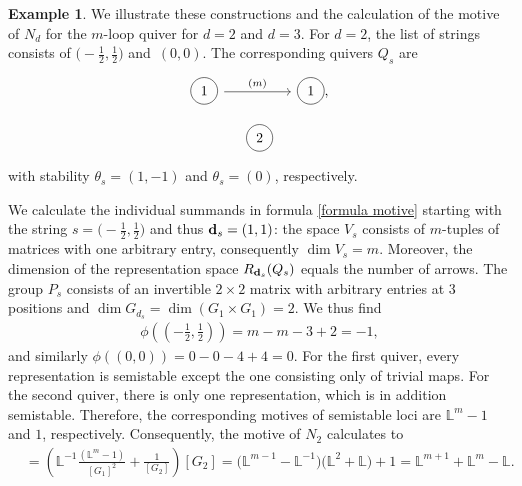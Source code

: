 \documentclass[pdftex]{sigma}
\newcommand\circlearound[1]{
 \tikz[baseline]\node[draw,shape=circle,anchor=base] {#1} ;}
\numberwithin{equation}{section}
\theoremstyle{definition}
\newtheorem{Example}[Theorem]{Example}
\begin{document}
\begin{Example}
We illustrate these constructions and the calculation of the motive of $N_{d}$ for the $m$-loop quiver for $d=2$ and $d=3$.
For $d=2$, the list of strings consists of
$\bigl(-\frac{1}{2}, \frac{1}{2}\bigr)$ and~$ (0,0)$. The corresponding quivers $Q_s$ are
\[\begin{tikzcd}
	\circlearound{1} && \circlearound{1}
	\arrow[from=1-1, to=1-3, "(m)"],
\end{tikzcd}\]
\[\begin{tikzcd}
	\circlearound{2}
\end{tikzcd}\]
with stability $\theta_s = (1,-1)$ and $\theta_s = (0)$, respectively.

We calculate the individual summands in formula \eqref{formula motive} starting with the string $s=\bigl(-\frac{1}{2}, \frac{1}{2}\bigr)$ and thus ${\bf d}_s = (1,1)$:
the space $V_s$ consists of $m$-tuples of matrices with one arbitrary entry, consequently $\dim V_s = m$. Moreover, the dimension of the representation space $R_{{\bf d}_s} (Q_s)$ equals the number of arrows. The group $P_s$ consists of an invertible $2\times 2$ matrix with arbitrary entries at $3$ positions and $\dim G_{d_s} = \dim (G_1 \times G_1) = 2$.
We thus find
\begin{align*}
\phi\left(\left(-\frac{1}{2}, \frac{1}{2}\right)\right) = m - m -3+2 = -1 ,
\end{align*}
and similarly
$
\phi ((0,0)) = 0-0-4+4 = 0 $.
For the first quiver, every representation is semistable except the one consisting only of trivial maps. For the second quiver, there is only one representation, which is in addition semistable. Therefore, the corresponding motives of semistable loci are $\mathbb{L}^m -1$ and $1$, respectively. Consequently, the motive of $N_2$ calculates to
\begin{align*}
[N_2] &= \left(\mathbb{L}^{-1} \frac{(\mathbb{L}^m -1)}{[G_1]^2}+ \frac{1}{[G_2]} \right) [G_2] = \bigl(\mathbb{L}^{m-1} - \mathbb{L}^{-1}\bigr) \bigl(\mathbb{L}^2 + \mathbb{L}\bigr) +1 = \mathbb{L}^{m+1} + \mathbb{L}^m - \mathbb{L} .
\end{align*}


\end{Example}
\end{document}
